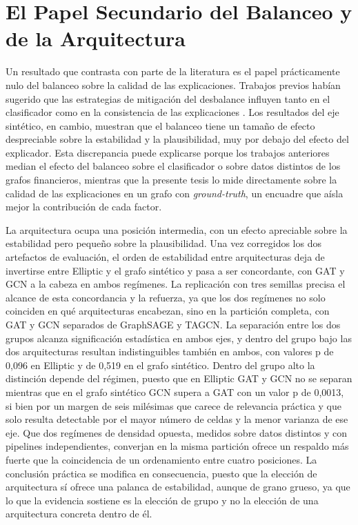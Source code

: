\section{El Papel Secundario del Balanceo y de la Arquitectura}

Un resultado que contrasta con parte de la literatura es el papel prácticamente nulo del balanceo sobre la calidad de las explicaciones. Trabajos previos habían sugerido que las estrategias de mitigación del desbalance influyen tanto en el clasificador como en la consistencia de las explicaciones \cite{Rai2025EvaluatingData, Fujiwara2024KnowledgeStability}. Los resultados del eje sintético, en cambio, muestran que el balanceo tiene un tamaño de efecto despreciable sobre la estabilidad y la plausibilidad, muy por debajo del efecto del explicador. Esta discrepancia puede explicarse porque los trabajos anteriores median el efecto del balanceo sobre el clasificador o sobre datos distintos de los grafos financieros, mientras que la presente tesis lo mide directamente sobre la calidad de las explicaciones en un grafo con \textit{ground-truth}, un encuadre que aísla mejor la contribución de cada factor.

La arquitectura ocupa una posición intermedia, con un efecto apreciable sobre la estabilidad pero pequeño sobre la plausibilidad. Una vez corregidos los dos artefactos de evaluación, el orden de estabilidad entre arquitecturas deja de invertirse entre Elliptic y el grafo sintético y pasa a ser concordante, con GAT y GCN a la cabeza en ambos regímenes. La replicación con tres semillas precisa el alcance de esta concordancia y la refuerza, ya que los dos regímenes no solo coinciden en qué arquitecturas encabezan, sino en la partición completa, con GAT y GCN separados de GraphSAGE y TAGCN. La separación entre los dos grupos alcanza significación estadística en ambos ejes, y dentro del grupo bajo las dos arquitecturas resultan indistinguibles también en ambos, con valores p de 0,096 en Elliptic y de 0,519 en el grafo sintético. Dentro del grupo alto la distinción depende del régimen, puesto que en Elliptic GAT y GCN no se separan mientras que en el grafo sintético GCN supera a GAT con un valor p de 0,0013, si bien por un margen de seis milésimas que carece de relevancia práctica y que solo resulta detectable por el mayor número de celdas y la menor varianza de ese eje. Que dos regímenes de densidad opuesta, medidos sobre datos distintos y con pipelines independientes, converjan en la misma partición ofrece un respaldo más fuerte que la coincidencia de un ordenamiento entre cuatro posiciones. La conclusión práctica se modifica en consecuencia, puesto que la elección de arquitectura sí ofrece una palanca de estabilidad, aunque de grano grueso, ya que lo que la evidencia sostiene es la elección de grupo y no la elección de una arquitectura concreta dentro de él.

